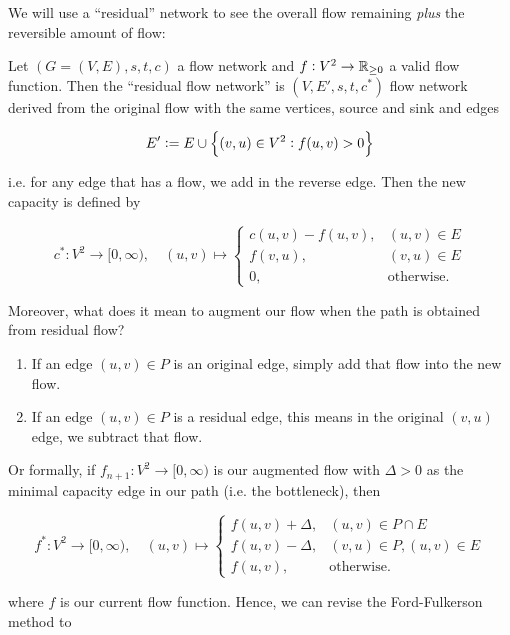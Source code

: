 We will use a ``residual'' network to see the overall flow remaining \textit{plus} the reversible amount of flow: 

\begin{define}
    \label{ch3:residual-network-def}
    Let $(G=(V,E), s,t,c)$ a flow network and $f:V^2\to \mathbb{{R}}_{\ge 0}$ a valid flow function. 
    Then the ``residual flow network'' is $(V,E',s,t,c^*)$ flow network derived from the original flow with the same vertices, source and sink and edges 

    \[
        E'\defeq E \cup \cbr{(v,u) \in V^2: f(u,v)>0}
    \]

    i.e. for any edge that has a flow, we add in the reverse edge.
    Then the new capacity is defined by 

    \[
        c^*: V^2\to [0,\infty), \quad (u,v) \mapsto \begin{cases}
            c(u,v)-f(u,v), & (u,v)\in E \\
            f(v,u), & (v,u)\in E \\
            0, & \text{otherwise.}
        \end{cases}
    \]
\end{define}

Moreover, what does it mean to augment our flow when the path is obtained from residual flow?
\begin{enumerate}
    \item If an edge $(u,v) \in P$ is an original edge, simply add that flow into the new flow.
    \item If an edge $(u,v) \in P$ is a residual edge, this means in the original $(v,u)$ edge, we subtract that flow. 
\end{enumerate}

Or formally, if $f_{n+1}:V^2\to [0,\infty)$ is our augmented flow with $\Delta>0$ as the minimal capacity edge in our path (i.e. the bottleneck), then 

\begin{equation}
    \label{ch3:flow-augment-func}
    f^*:V^2\to [0,\infty), \quad (u,v) \mapsto \begin{cases}
        f(u,v) + \Delta, & (u,v) \in P \cap E\\
        f(u,v)-\Delta, & (v,u) \in P, (u,v)\in E \\
        f(u,v), & \text{otherwise.}
    \end{cases}
\end{equation}

where $f$ is our current flow function. 
Hence, we can revise the Ford-Fulkerson method to

